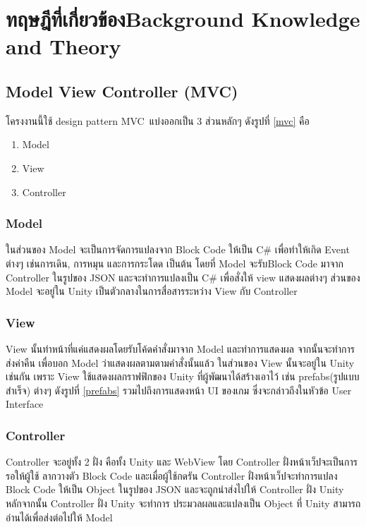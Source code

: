 \chapter{\ifcpe ทฤษฎีที่เกี่ยวข้อง\else Background Knowledge and Theory\fi}

\section{Model View Controller (MVC)}
โครงงานนี้ใช้ design pattern MVC~\cite{mvc}แบ่งออกเป็น 3 ส่วนหลักๆ ดังรูปที่ \ref{mvc} คือ 
\begin{enumerate}
    \item Model
    \item View
    \item Controller
\end{enumerate}


\subsection{Model}
 ในส่วนของ Model จะเป็นการจัดการแปลงจาก Block Code ให้เป็น C\# เพื่อทำให้เกิด Event ต่างๆ เช่นการเดิน, การหมุน
 และการกระโดด เป็นต้น โดยที่ Model จะรับBlock Code มาจาก Controller ในรูปของ JSON
 และจะทำการแปลงเป็น C\# เพื่อสั่งให้ view แสดงผลต่างๆ ส่วนของ Model จะอยู่ใน Unity
 เป็นตัวกลางในการสื่อสารระหว่าง View กับ Controller

\subsection{View}
View นั้นทำหน้าที่แค่แสดงผลโดยรับโค้ดคำสั่งมาจาก Model และทำการแสดงผล จากนั้นจะทำการ
ส่งค่าคืน เพื่อบอก Model ว่าแสดงผลตามตามคำสั่งนั้นแล้ว ในส่วนของ View นั้นจะอยู่ใน
Unity เช่นกัน เพราะ View ใช้แสดงผลกราฟฟิกของ Unity ที่ผู้พัฒนาได้สร้างเอาไว้ เช่น prefabs(รูปแบบสำเร็จ) ต่างๆ ดังรูปที่ \ref{prefabs}
รวมไปถึงการแสดงหน้า UI ของเกม ซึ่งจะกล่าวถึงในหัวข้อ User Interface\par
    

\subsection{Controller}
Controller จะอยู่ทั้ง 2 ฝั่ง คือทั้ง Unity และ WebView โดย Controller ฝั่งหน้าเว็ปจะเป็นการรอให้ผู้ใช้
ลากวางตัว Block Code และเมื่อผู้ใช้กดรัน Controller ฝั่งหน้าเว็ปจะทำการแปลง Block Code ให้เป็น Object 
ในรูปของ JSON และจะถูกนำส่งไปให้ Controller ฝั่ง Unity หลักจากนั้น Controller ฝั่ง Unity จะทำการ
ประมวลผลและแปลงเป็น Object ที่ Unity สามารถอ่านได้เพื่อส่งต่อไปให้ Model



